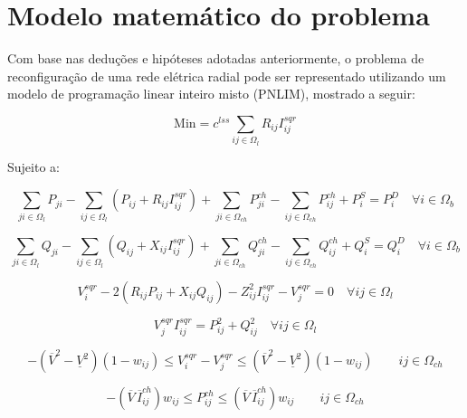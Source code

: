 \section{Modelo matemático do problema}

Com base nas deduções e hipóteses adotadas anteriormente, o problema de reconfiguração de uma rede elétrica radial pode ser representado utilizando um modelo de programação linear inteiro misto (PNLIM), mostrado a seguir:

\begin{equation*}
    \text{Min} = c^{lss}\sum_{ij\in\Omega_{l}}R_{ij}I_{ij}^{sqr}
\end{equation*}

Sujeito a:

\begin{equation*}
    \sum_{ji\in\Omega_{l}}P_{ji} - \sum_{ij\in\Omega_{l}}(P_{ij} + R_{ij}I_{ij}^{sqr})+ \sum_{ji\in\Omega_{ch}}P_{ji}^{ch} -\sum_{ij\in\Omega_{ch}}P_{ij}^{ch} + P_{i}^{S} = P_{i}^{D}\quad\forall i \in\Omega_{b}  
\end{equation*}
    
\begin{equation*}
    \sum_{ji\in\Omega_{l}}Q_{ji} - \sum_{ij\in\Omega_{l}}(Q_{ij} + X_{ij}I_{ij}^{sqr})+ \sum_{ji\in\Omega_{ch}}Q_{ji}^{ch} -\sum_{ij\in\Omega_{ch}}Q_{ij}^{ch} + Q_{i}^{S} = Q_{i}^{D}\quad\forall i \in\Omega_{b}
\end{equation*}

\begin{equation*}
    V_{i}^{sqr} - 2(R_{ij}P_{ij} + X_{ij}Q_{ij}) - Z_{ij}^{2}I_{ij}^{sqr} - V_{j}^{sqr} = 0\quad\forall ij \in \Omega_{l}
\end{equation*}

\begin{equation*}
    V_{j}^{sqr}I_{ij}^{sqr} = P_{ij}^{2}+Q_{ij}^{2}\quad\forall ij \in \Omega_{l}
\end{equation*}

\begin{equation*}
    -(\overline{V}^{2} - \underline{V}^{2})(1-w_{ij}) \leq V_{i}^{sqr} - V_{j}^{sqr} \leq (\overline{V}^{2} - \underline{V}^{2})(1-w_{ij})\qquad ij\in\Omega_{ch}        
\end{equation*}
    
\begin{equation*}
    -(\overline{V}\,\overline{I}_{ij}^{ch})w_{ij} \leq P_{ij}^{ch} \leq (\overline{V}\,\overline{I}_{ij}^{ch})w_{ij}\qquad ij\in\Omega_{ch}
\end{equation*}
    

